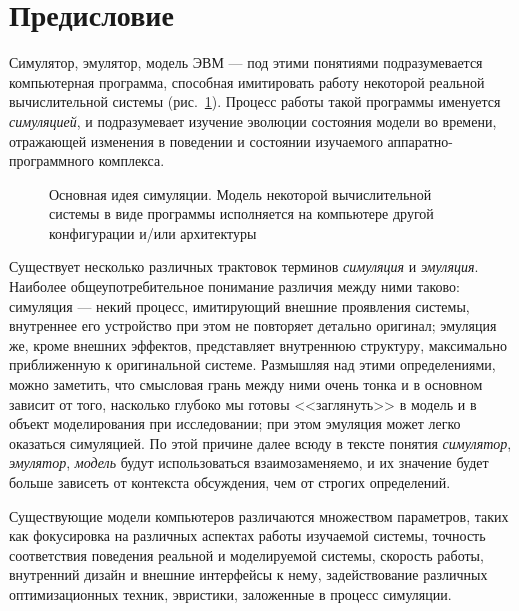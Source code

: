 \chapter*{Предисловие}\label{overview}



Симулятор, эмулятор, модель ЭВМ --- под этими понятиями подразумевается компьютерная программа, способная имитировать работу некоторой реальной вычислительной системы (рис.~\ref{fig:idea}). Процесс работы такой программы именуется \textit{симуляцией}, и подразумевает изучение эволюции состояния модели во времени, отражающей изменения в поведении и состоянии изучаемого аппаратно-программного комплекса.


\setcounter{chapter}{1} %
\setcounter{figure}{-1}
\begin{figure}[tp]
    \centering
	\iftoggle{htmlpaper}{
			\texttt{[image: drawings/idea-0]}
		}{
			
		}
    \caption[Основная идея симуляции]{Основная идея симуляции. Модель некоторой вычислительной системы в виде программы исполняется на компьютере другой конфигурации и/или архитектуры}
    \label{fig:idea}
\end{figure}
\setcounter{chapter}{0} %
\setcounter{figure}{0}

Существует несколько различных трактовок терминов \textit{симуляция} и \textit{эмуляция}. Наиболее общеупотребительное понимание различия между ними таково: симуляция --- некий процесс, имитирующий внешние проявления системы, внутреннее его устройство при этом не повторяет детально оригинал; эмуляция же, кроме внешних эффектов, представляет внутреннюю структуру, максимально приближенную к оригинальной системе. Размышляя над этими определениями, можно заметить, что смысловая грань между ними очень тонка и в основном зависит от того, насколько глубоко мы готовы <<заглянуть>> в модель и в объект моделирования при исследовании; при этом эмуляция может легко оказаться симуляцией. По этой причине далее всюду в тексте понятия \textit{симулятор}, \textit{эмулятор}, \textit{модель} будут использоваться взаимозаменяемо, и их значение будет больше зависеть от контекста обсуждения, чем от строгих определений.

Существующие модели компьютеров различаются множеством параметров, таких как фокусировка на различных аспектах работы изучаемой системы, точность соответствия поведения реальной и моделируемой системы, скорость работы, внутренний дизайн и внешние интерфейсы к нему, задействование различных оптимизационных техник, эвристики, заложенные в процесс симуляции.

